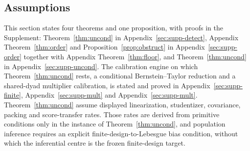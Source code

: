 \documentclass[11pt]{article}
\theoremstyle{definition}
\newcommand{\1}{\mathbf 1}\newcommand{\op}{\operatorname}
\begin{document}
\subsection{Assumptions}
This section states four theorems and one proposition, with proofs in the
Supplement: Theorem~\ref{thm:uncond} in Appendix~\ref{sec:supp-detect},
Appendix Theorem~\ref{thm:order} and Proposition~\ref{prop:obstruct} in
Appendix~\ref{sec:supp-order} together with Appendix Theorem~\ref{thm:floor}, and
Theorem~\ref{thm:uncond} in Appendix~\ref{sec:supp-uncond}.  The calibration
engine on which Theorem~\ref{thm:uncond} rests, a conditional
Bernstein--Taylor reduction and a shared-dyad multiplier calibration, is
stated and proved in Appendix~\ref{sec:supp-finite}, Appendix~\ref{sec:supp-mult}
and Appendix~\ref{sec:supp-mult}.  Theorem~\ref{thm:uncond} assume displayed linearization, studentizer, covariance,
packing and score-transfer rates.  Those rates are derived from primitive
conditions only in the instance of Theorem~\ref{thm:uncond}, and population
inference requires an explicit finite-design-to-Lebesgue bias condition,
without which the inferential centre is the frozen finite-design target.
\end{document}
